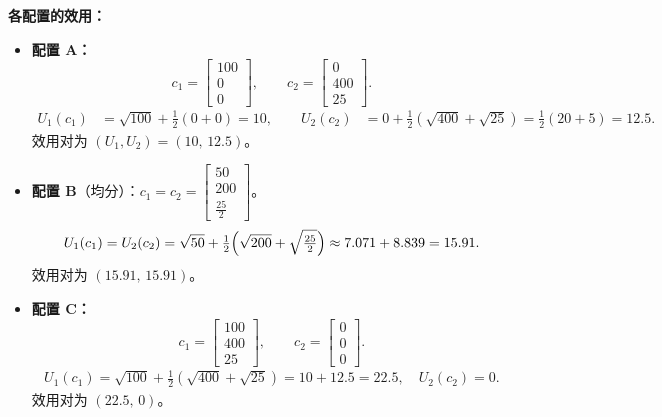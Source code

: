 \begin{tcolorbox}[example,title=例题：帕累托最优]
\begin{solution}
        \textbf{各配置的效用：}
        \begin{itemize}
            \item \textbf{配置 A：}
            \[
                c_1=\begin{bmatrix}100 \\ 0 \\ 0\end{bmatrix},\qquad
                c_2=\begin{bmatrix}0 \\ 400 \\ 25\end{bmatrix}.
            \]
            \[
                \begin{aligned}
                    U_1(c_1) &= \sqrt{100}+\tfrac12(0+0)=10,\qquad 
                    U_2(c_2) &= 0+\tfrac12(\sqrt{400}+\sqrt{25})
                    =\tfrac12(20+5)=12.5.
                \end{aligned}
            \]
            效用对为 $(U_1,U_2)=(10,\,12.5)$。

            \item \textbf{配置 B}（均分）：$c_1=c_2=
            \begin{bmatrix}50 \\ 200 \\ \tfrac{25}{2}\end{bmatrix}$。
            \[
                U_1(c_1)=U_2(c_2)=\sqrt{50}+\tfrac12\Bigl(\sqrt{200}+\sqrt{\tfrac{25}{2}}\Bigr)
                \approx 7.071+8.839=15.91.
            \]
            效用对为 $(15.91,\,15.91)$。

            \item \textbf{配置 C：}
            \[
                c_1=\begin{bmatrix}100 \\ 400 \\ 25\end{bmatrix},\qquad
                c_2=\begin{bmatrix}0 \\ 0 \\ 0\end{bmatrix}.
            \]
            \[
                \begin{aligned}
                    U_1(c_1) = \sqrt{100}+\tfrac12(\sqrt{400}+\sqrt{25})=10+12.5=22.5, \quad
                    U_2(c_2) = 0.
                \end{aligned}
            \]
            效用对为 $(22.5,\,0)$。
        \end{itemize}


\end{solution}
\end{tcolorbox}
